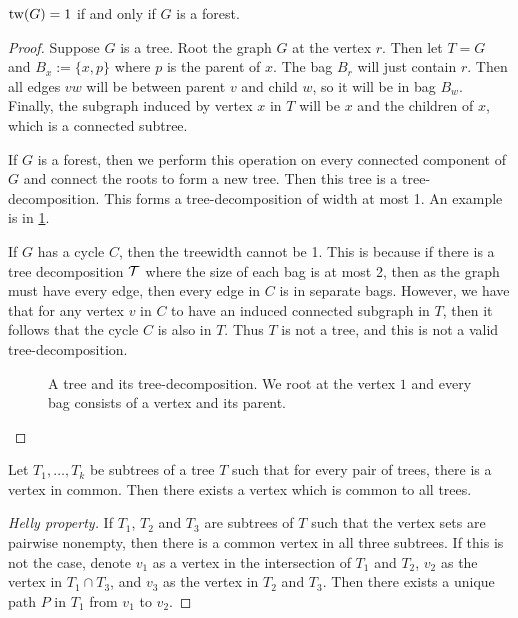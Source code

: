 \begin{lemma}\label{lem:treewidth_forest}
	\(\operatorname{tw}(G) = 1\) if and only if \(G\) is a forest.
\end{lemma}
\begin{proof}
	Suppose \(G\) is a tree. Root the graph \(G\) at the vertex \(r\). Then let \(T = G\) and \(B_x:= \lbrace x, p \rbrace\) where \(p\) is the parent of \(x\). The bag \(B_r\) will just contain \(r\). Then all edges \(vw\) will be between parent \(v\) and child \(w\), so it will be in bag \(B_w\). Finally, the subgraph induced by vertex \(x\) in \(T\) will be \(x\) and the children of \(x\), which is a connected subtree.
	\par
	If \(G\) is a forest, then we perform this operation on every connected component of \(G\) and connect the roots to form a new tree. Then this tree is a tree-decomposition. This forms a tree-decomposition of width at most 1. An example is in \cref{fig:tree-treedecomp}.
	\par
	If \(G\) has a cycle \(C\), then the treewidth cannot be 1. This is because if there is a tree decomposition \(\mathcal{T}\) where the size of each bag is at most 2, then as the graph must have every edge, then every edge in \(C\) is in separate bags. However, we have that for any vertex \(v\) in \(C\) to have an induced connected subgraph in \(T\), then it follows that the cycle \(C\) is also in \(T\). Thus \(T\) is not a tree, and this is not a valid tree-decomposition.
	\begin{figure}[ht]
		\centering
		
		
		\caption{A tree and its tree-decomposition. We root at the vertex \(1\) and every bag consists of a vertex and its parent.}\label{fig:tree-treedecomp}
	\end{figure}
\end{proof}

\begin{lemma}\label{lem:Helly}
	Let \(T_1, \ldots, T_k\) be subtrees of a tree \(T\) such that for every pair of trees, there is a vertex in common. Then there exists a vertex which is common to all trees.
\end{lemma}
\begin{proof}[Helly property]
	If \(T_1\), \(T_2\) and \(T_3\) are subtrees of \(T\) such that the vertex sets are pairwise nonempty, then there is a common vertex in all three subtrees. If this is not the case, denote \(v_1\) as a vertex in the intersection of \(T_1\) and \(T_2\), \(v_2\) as the vertex in \(T_1 \cap T_3\), and \(v_3\) as the vertex in \(T_2\) and \(T_3\). Then there exists a unique path \(P\) in \(T_1\) from \(v_1\) to \(v_2\).
\end{proof}

